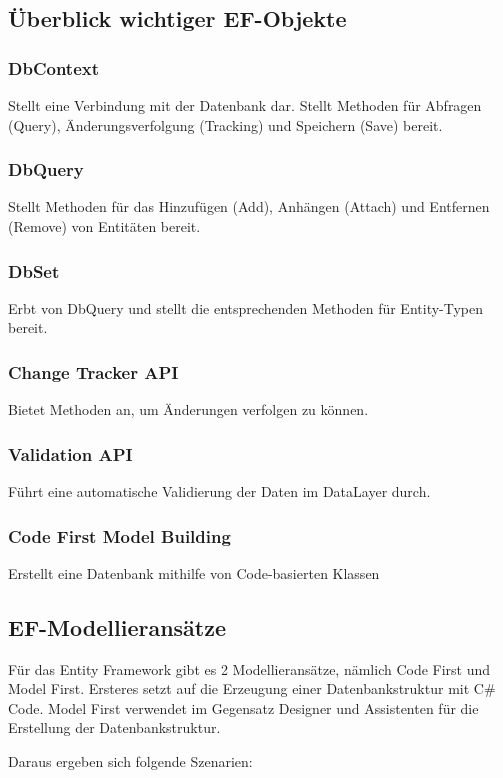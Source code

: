 \subsection{Überblick wichtiger EF-Objekte}
\subsubsection{DbContext}
Stellt eine Verbindung mit der Datenbank dar. Stellt Methoden für Abfragen (Query),
Änderungsverfolgung (Tracking) und Speichern (Save) bereit.

\subsubsection{DbQuery}
Stellt Methoden für das Hinzufügen (Add), Anhängen (Attach) und Entfernen (Remove) von
Entitäten bereit.

\subsubsection{DbSet}
Erbt von DbQuery und stellt die entsprechenden Methoden für Entity-Typen bereit.

\subsubsection{Change Tracker API}
Bietet Methoden an, um Änderungen verfolgen zu können.

\subsubsection{Validation API}
Führt eine automatische Validierung der Daten im DataLayer durch.

\subsubsection{Code First Model Building}
Erstellt eine Datenbank mithilfe von Code-basierten Klassen

\subsection{EF-Modellieransätze}
Für das Entity Framework gibt es 2 Modellieransätze, nämlich Code First und Model First. Ersteres setzt auf die Erzeugung einer 
Datenbankstruktur mit C\# Code. Model First verwendet im Gegensatz Designer und Assistenten für die Erstellung der Datenbankstruktur.

Daraus ergeben sich folgende Szenarien:

